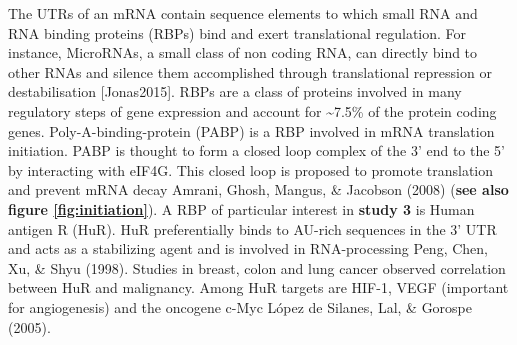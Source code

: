 \documentclass[
  12pt,
  openany]{book}
\begin{document}
The UTRs of an mRNA contain sequence elements to which small RNA and RNA binding proteins (RBPs) bind and exert translational regulation. For instance, MicroRNAs, a small class of non coding RNA, can directly bind to other RNAs and silence them accomplished through translational repression or destabilisation {[}Jonas2015{]}. RBPs are a class of proteins involved in many regulatory steps of gene expression and account for \textasciitilde7.5\% of the protein coding genes. Poly-A-binding-protein (PABP) is a RBP involved in mRNA translation initiation. PABP is thought to form a closed loop complex of the 3' end to the 5' by interacting with eIF4G. This closed loop is proposed to promote translation and prevent mRNA decay Amrani, Ghosh, Mangus, \& Jacobson (2008) (\textbf{see also figure \ref{fig:initiation}}). A RBP of particular interest in \textbf{study 3} is Human antigen R (HuR). HuR preferentially binds to AU-rich sequences in the 3' UTR and acts as a stabilizing agent and is involved in RNA-processing Peng, Chen, Xu, \& Shyu (1998). Studies in breast, colon and lung cancer observed correlation between HuR and malignancy. Among HuR targets are HIF-1, VEGF (important for angiogenesis) and the oncogene c-Myc López de Silanes, Lal, \& Gorospe (2005).
\end{document}
